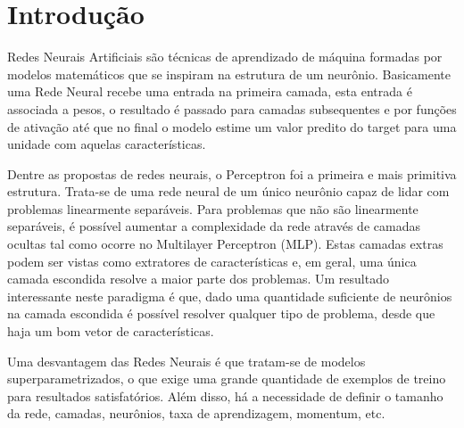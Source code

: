 \documentclass[
	12pt,				%
	openright,			%
	twoside,			%
	a4paper,			%
	english,			%
	brazil,				%
	svgnames
	]{abntex2}\usepackage[]{graphicx}\usepackage[]{color}
\begin{document}

\tableofcontents*
\cleardoublepage

\textual

\chapter{Introdução}
\label{cap:introducao}


Redes Neurais Artificiais são técnicas de aprendizado de máquina formadas por modelos matemáticos que se inspiram na estrutura de um neurônio. Basicamente uma Rede Neural recebe uma entrada na primeira camada, esta entrada é associada a pesos, o resultado é passado para camadas subsequentes e por funções de ativação até que no final o modelo estime um valor predito do target para uma unidade com aquelas características.

Dentre as propostas de redes neurais, o Perceptron foi a primeira e mais primitiva estrutura. Trata-se de uma rede neural de um único neurônio capaz de lidar com problemas linearmente separáveis. Para problemas que não são linearmente separáveis, é possível aumentar a complexidade da rede através de camadas ocultas tal como ocorre no Multilayer Perceptron (MLP). Estas camadas extras podem ser vistas como extratores de características e, em geral, uma única camada escondida resolve a maior parte dos problemas. Um resultado interessante neste paradigma é que, dado uma quantidade suficiente de neurônios na camada escondida é possível resolver qualquer tipo de problema, desde que haja um bom vetor de características. 

Uma desvantagem das Redes Neurais é que tratam-se de modelos superparametrizados, o que exige uma grande quantidade de exemplos de treino para resultados satisfatórios. Além disso, há a necessidade de definir o tamanho da rede, camadas, neurônios, taxa de aprendizagem, momentum, etc.
\end{document}
